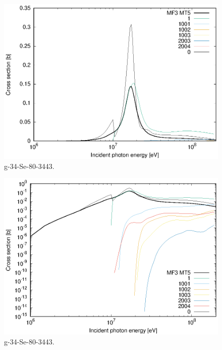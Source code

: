 \begin{figure}
 \includegraphics[width=\linewidth]{eps/g_34-Se-80_3443.eps}
  \caption{g-34-Se-80-3443.}
\end{figure}
\begin{figure}
 \includegraphics[width=\linewidth]{eps-log/g_34-Se-80_3443.eps}
 \caption{g-34-Se-80-3443.}
\end{figure}
\newpage \clearpage

